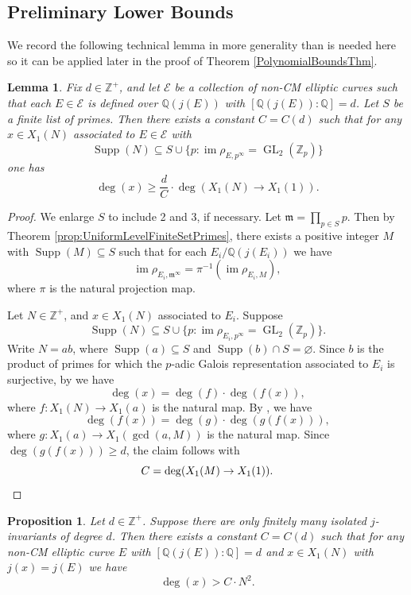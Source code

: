 \documentclass{amsart}
\newtheorem{proposition}{Proposition}
\newtheorem{lemma}{Lemma}
\theoremstyle{definition}
\newcommand{\Q}{\mathbb{Q}}
\newcommand{\Z}{\mathbb{Z}}
\newcommand{\GL}{\operatorname{GL}}
\newcommand{\Supp}{\operatorname{Supp}}
\DeclareMathOperator{\im}{im}
\begin{document}
\subsection{Preliminary Lower Bounds} We record the following technical lemma in more generality than is needed here so it can be applied later in the proof of Theorem \ref{PolynomialBoundsThm}.
\begin{lemma}\label{Finite_Degree_Bounds}
Fix $d \in \Z^+$, and let $\mathcal{E}$ be a collection of non-CM elliptic curves such that each $E\in \mathcal{E}$ is defined over $\Q(j(E))$ with $[\Q(j(E)):\Q]=d$. Let $S$ be a finite list of primes. Then there exists a constant $C=C(d)$ such that for any $x\in X_1(N)$ associated to $E \in \mathcal{E}$ with
\[
\Supp(N) \subseteq S \cup \{p: \im \rho_{E, p^{\infty}}=\GL_2(\Z_{p}) \}
\] one has
   \[
    \deg(x)\geq \frac{d}{C} \cdot \deg(X_1(N) \rightarrow X_1(1)).
    \]
\end{lemma}
\begin{proof}
    We enlarge $S$ to include 2 and 3, if necessary. Let $\mathfrak{m}=\prod_{p \in S} p$. Then by Theorem \ref{prop:UniformLevelFiniteSetPrimes}, there exists a positive integer $M$ with $\Supp(M) \subseteq S$ such that for each $E_i/\Q(j(E_i))$ we have
    \[
    \im \rho_{E_i,\mathfrak{m}^{\infty}}=\pi^{-1}(\im \rho_{E_i,M}),
    \]
    where $\pi$ is the natural projection map.

    Let $N\in \Z^+$, and $x \in X_1(N)$ associated to $E_i$. Suppose \[\Supp(N) \subseteq S \cup \{p: \im \rho_{E_i, p^{\infty}}=\GL_2(\Z_{p})\}.\] Write $N=ab$, where $\Supp(a) \subseteq S$ and $\Supp(b) \cap S = \varnothing$. Since $b$ is the product of primes for which the $p$-adic Galois representation associated to $E_i$ is surjective, by \cite[Proposition 5.7]{BELOV} we have
    \[
\deg(x)=\deg(f)\cdot\deg(f(x)),
    \]
    where $f:X_1(N) \rightarrow X_1(a)$ is the natural map. By \cite[Proposition 5.8]{BELOV}, we have
    \[
    \deg(f(x))=\deg(g) \cdot \deg(g(f(x))),
    \]
    where $g: X_1(a) \rightarrow X_1(\gcd(a,M))$ is the natural map. Since $\deg(g(f(x))) \geq d$, the claim follows with
    \[
    C=\deg(X_1(M) \rightarrow X_1(1)). \qedhere
    \]
\end{proof}
\begin{proposition}\label{Prop_Isol_Lower_Bound}
    Let $d\in \Z^+$. Suppose there are only finitely many isolated $j$-invariants of degree $d$. Then there exists a constant $C=C(d)$ such that for any non-CM elliptic curve $E$ with $[\Q(j(E)):\Q]=d$ and $x\in X_1(N)$ with $j(x)=j(E)$ we have
    \[
    \deg(x) > C \cdot N^2.
    \]
\end{proposition}
\end{document}
